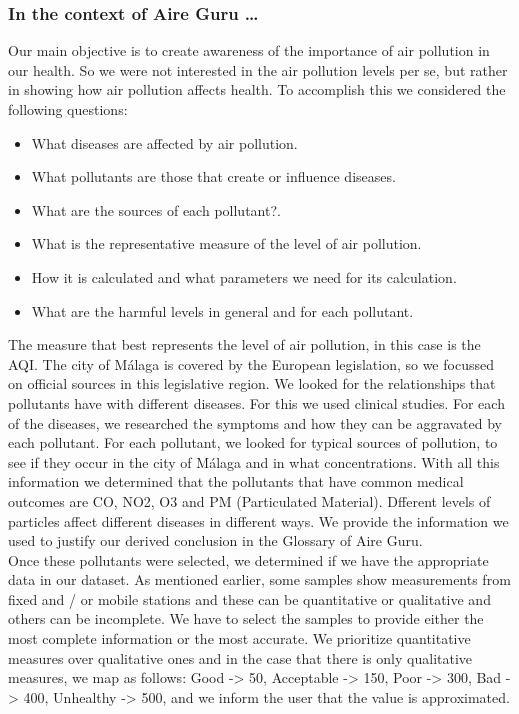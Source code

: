 \subsubsection*{In the context of Aire Guru \ldots}

Our main objective is to create awareness of the importance of air pollution in our health.
So we were not interested in the air pollution levels per se, but rather in showing how air pollution affects health.
To accomplish this we considered the following questions:

\begin{itemize}
    \item What diseases are affected by air pollution.
    \item What pollutants are those that create or influence diseases.
    \item What are the sources of each pollutant?.
    \item What is the representative measure of the level of air pollution.
    \item How it is calculated and what parameters we need for its calculation.
    \item What are the harmful levels in general and for each pollutant.
\end{itemize}

The measure that best represents the level of air pollution, in this case is the AQI. The city of Málaga is covered by the European legislation, 
so we focussed on official sources in this legislative region.
We looked for the relationships that pollutants have with different diseases.
For this we used clinical studies.
For each of the diseases, we researched the symptoms and how they can be aggravated by each pollutant.
For each pollutant, we looked for typical sources of pollution, to see if they occur in the city of Málaga and in what concentrations.
With all this information we determined that the pollutants that have common medical outcomes are CO, NO2, O3 and PM (Particulated Material).
Dfferent levels of particles affect different diseases in different ways.
We provide the information we used to justify our derived conclusion in the Glossary of Aire Guru. \\

Once these pollutants were selected, we determined if we have the appropriate data in our dataset.
As mentioned earlier, some samples show measurements from fixed and / or mobile stations and these can be quantitative or qualitative and others can be incomplete.
We have to select the samples to provide either the most complete information or the most accurate.
We prioritize quantitative measures over qualitative ones and in the case that there is only qualitative measures, we map as follows:
Good -> 50, Acceptable -> 150, Poor -> 300, Bad -> 400, Unhealthy -> 500, and we inform the user that the value is approximated.\\

